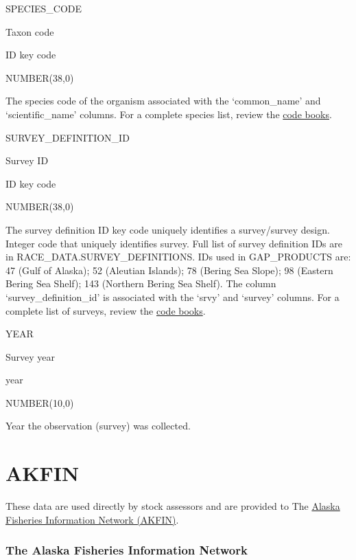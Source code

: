 \documentclass[
  letterpaper,
  oneside,
  open=any]{scrbook}
\begin{document}
SPECIES\_CODE

Taxon code

ID key code

NUMBER(38,0)

The species code of the organism associated with the `common\_name' and
`scientific\_name' columns. For a complete species list, review the
\href{https://www.fisheries.noaa.gov/resource/document/groundfish-survey-species-code-manual-and-data-codes-manual}{code
books}.

SURVEY\_DEFINITION\_ID

Survey ID

ID key code

NUMBER(38,0)

The survey definition ID key code uniquely identifies a survey/survey
design. Integer code that uniquely identifies survey. Full list of
survey definition IDs are in RACE\_DATA.SURVEY\_DEFINITIONS. IDs used in
GAP\_PRODUCTS are: 47 (Gulf of Alaska); 52 (Aleutian Islands); 78
(Bering Sea Slope); 98 (Eastern Bering Sea Shelf); 143 (Northern Bering
Sea Shelf). The column `survey\_definition\_id' is associated with the
`srvy' and `survey' columns. For a complete list of surveys, review the
\href{https://www.fisheries.noaa.gov/resource/document/groundfish-survey-species-code-manual-and-data-codes-manual}{code
books}.

YEAR

Survey year

year

NUMBER(10,0)

Year the observation (survey) was collected.

\part{AKFIN}

These data are used directly by stock assessors and are provided to The
\href{https://akfin.psmfc.org/}{Alaska Fisheries Information Network
(AKFIN)}.

\hypertarget{the-alaska-fisheries-information-network}{%
\section*{The Alaska Fisheries Information
Network}\label{the-alaska-fisheries-information-network}}

\end{document}
